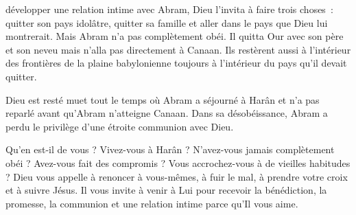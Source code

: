 
 développer une relation intime avec Abram,
 Dieu l'invita à faire trois choses~: quitter son pays idolâtre,
 quitter sa famille et aller dans le pays que Dieu lui montrerait.
 Mais Abram n'a pas complètement obéi.
 Il quitta Our avec son père et son neveu mais n'alla pas directement
 à Canaan.
 Ils restèrent aussi à l'intérieur des frontières de la plaine babylonienne
 \ocadr{}toujours à l'intérieur du pays qu'il devait quitter. 


Dieu est resté muet tout le temps où Abram a séjourné à Harân
 et n'a pas reparlé avant qu'Abram n'atteigne Canaan.
 Dans sa désobéissance, Abram a perdu le privilège d'une étroite
 communion avec Dieu. 

Qu'en est-il de vous ? Vivez-vous à Harân ?
 N'avez-vous jamais complètement obéi ? Avez-vous fait des compromis ?
 Vous accrochez-vous à de vieilles habitudes ?
 Dieu vous appelle à renoncer à vous-mêmes, à fuir le mal,
 à prendre votre croix et à suivre Jésus.
 Il vous invite à venir à Lui pour recevoir la bénédiction,
 la promesse, la communion et une relation intime
 \ocadr{}parce qu'Il vous aime. 

\dvrule







